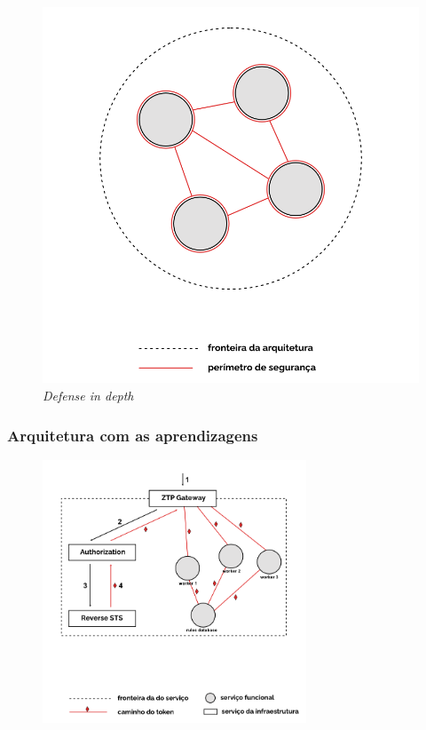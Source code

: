 \begin{frame}
\begin{figure}
\begin{minipage}[c]{0.4\textwidth}
            \includegraphics[width=1.2\textwidth]{./assets/seguranca/defense_in_depth.png}
            \caption{\textit{Defense in depth}} 
        \end{minipage}
    \end{figure}
\end{frame}    

\begin{frame}
    \frametitle{Arquitetura com as aprendizagens}
    \begin{figure}
        \includegraphics[width=0.7\textwidth]{./assets/seguranca/security_ztp.png}
    \end{figure}
\end{frame}    
